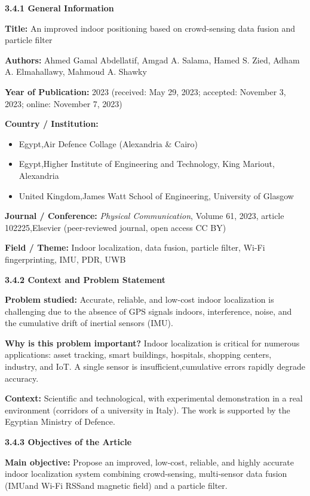 \documentclass{ipgpmaster}
\begin{document}
\textbf{3.4.1 General Information}

\textbf{Title:} An improved indoor positioning based on crowd-sensing data fusion and particle filter

\textbf{Authors:} Ahmed Gamal Abdellatif, Amgad A. Salama, Hamed S. Zied, Adham A. Elmahallawy, Mahmoud A. Shawky

\textbf{Year of Publication:} 2023 (received: May 29, 2023; accepted: November 3, 2023; online: November 7, 2023)

\textbf{Country / Institution:}

\begin{itemize}
    \item Egypt,Air Defence Collage (Alexandria \& Cairo)
    \item Egypt,Higher Institute of Engineering and Technology, King Mariout, Alexandria
    \item United Kingdom,James Watt School of Engineering, University of Glasgow
\end{itemize}
\textbf{Journal / Conference:} \textit{Physical Communication}, Volume 61, 2023, article 102225,Elsevier (peer-reviewed journal, open access CC BY)

\textbf{Field / Theme:} Indoor localization, data fusion, particle filter, Wi-Fi fingerprinting, IMU, PDR, UWB

 \textbf{3.4.2 Context and Problem Statement}

\textbf{Problem studied:} Accurate, reliable, and low-cost indoor localization is challenging due to the absence of GPS signals indoors, interference, noise, and the cumulative drift of inertial sensors (IMU).

\textbf{Why is this problem important?} Indoor localization is critical for numerous applications: asset tracking, smart buildings, hospitals, shopping centers, industry, and IoT. A single sensor is insufficient,cumulative errors rapidly degrade accuracy.

\textbf{Context:} Scientific and technological, with experimental demonstration in a real environment (corridors of a university in Italy). The work is supported by the Egyptian Ministry of Defence.

 \textbf{3.4.3   Objectives of the Article}

\textbf{Main objective:} Propose an improved, low-cost, reliable, and highly accurate indoor localization system combining crowd-sensing, multi-sensor data fusion (IMUand  Wi-Fi RSSand  magnetic field) and a particle filter.
\end{document}
